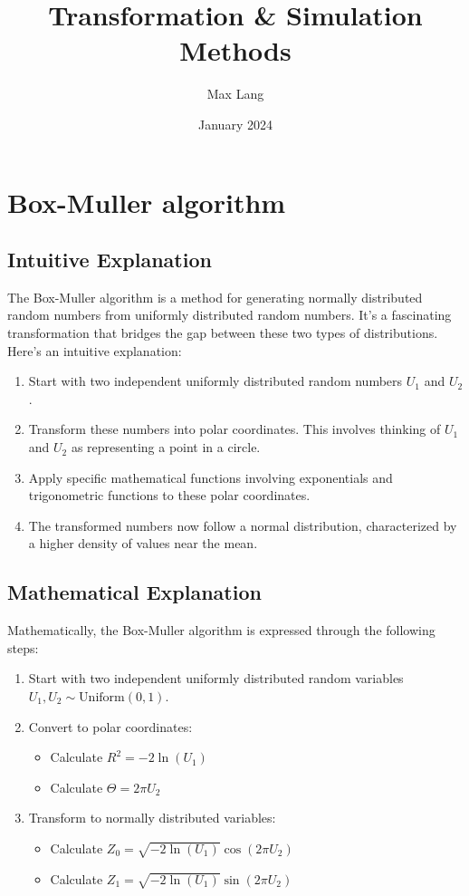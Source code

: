 \documentclass{article}
\title{Transformation \& Simulation Methods}
\author{Max Lang}
\date{January 2024}
\begin{document}
\maketitle
\section{Box-Muller algorithm}
\subsection{Intuitive Explanation}

The Box-Muller algorithm is a method for generating normally distributed random numbers from uniformly distributed random numbers. It's a fascinating transformation that bridges the gap between these two types of distributions. Here's an intuitive explanation:

\begin{enumerate}
    \item Start with two independent uniformly distributed random numbers \( U_1 \) and \( U_2 \).
    \item Transform these numbers into polar coordinates. This involves thinking of \( U_1 \) and \( U_2 \) as representing a point in a circle.
    \item Apply specific mathematical functions involving exponentials and trigonometric functions to these polar coordinates.
    \item The transformed numbers now follow a normal distribution, characterized by a higher density of values near the mean.
\end{enumerate}

\subsection{Mathematical Explanation}

Mathematically, the Box-Muller algorithm is expressed through the following steps:

\begin{enumerate}
    \item Start with two independent uniformly distributed random variables \( U_1, U_2 \sim \text{Uniform}(0, 1) \).
    \item Convert to polar coordinates:
    \begin{itemize}
        \item Calculate \( R^2 = -2 \ln(U_1) \)
        \item Calculate \( \Theta = 2\pi U_2 \)
    \end{itemize}
    \item Transform to normally distributed variables:
    \begin{itemize}
        \item Calculate \( Z_0 = \sqrt{-2 \ln(U_1)} \cos(2\pi U_2) \)
        \item Calculate \( Z_1 = \sqrt{-2 \ln(U_1)} \sin(2\pi U_2) \)
    \end{itemize}
\end{enumerate}
\end{document}
